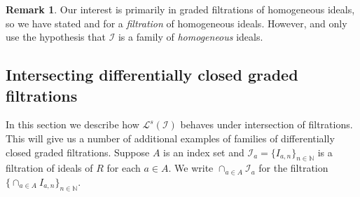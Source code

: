\documentclass[12pt, reqno]{amsart}
\numberwithin{equation}{section}
\newcommand{\N}{{\mathbb N}}
\newcommand{\cL}{{\mathcal L}}
\newcommand{\I}{{\mathcal I}}
\theoremstyle{plain} %
\theoremstyle{definition}
\newtheorem{rem}[thm]{Remark}
\theoremstyle{remark}
\begin{document}
\begin{rem}\label{rem:onlyHomogeneous}
Our interest is primarily in graded filtrations of homogeneous ideals, so we have stated  and  for a \textit{filtration} of homogeneous ideals.  However,  and  only use the hypothesis that $\I$ is a family of \textit{homogeneous} ideals.
\end{rem}

\subsection{Intersecting differentially closed graded filtrations}
In this section we describe how $\cL^s(\I)$ behaves under intersection of filtrations.  This will give us a number of additional examples of families of differentially closed graded filtrations.  Suppose $A$ is an index set and $\I_a=\{I_{a,n}\}_{n\in \N}$ is a filtration of ideals of $R$ for each $a\in A$.  We write $\cap_{a\in A} \I_a$ for the filtration $\{\cap_{a\in A} I_{a,n}\}_{n\in\N}$.
\end{document}
